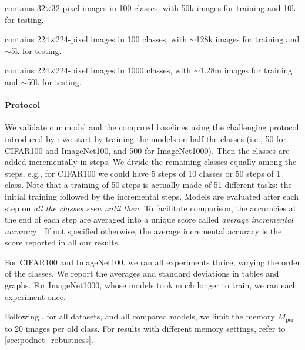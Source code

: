 {\begin{description} \setlength{\parskip}{0pt}
    \item[CIFAR100] contains 32$\times$32-pixel images in 100 classes, with 50k images for training
          and 10k for testing.
    \item[ImageNet100] contains 224$\times$224-pixel images in 100 classes, with $\sim$128k images
          for training and $\sim$5k for testing.
    \item[ImageNet1000] contains 224$\times$224-pixel images in 1000 classes, with $\sim$1.28m
          images for training and $\sim$50k for testing. \end{description}}

\paragraph{Protocol} We validate our model and the compared baselines using the challenging protocol
introduced by \cite{hou2019ucir}: we start by training the models on half the classes
(i.e., 50 for CIFAR100 and ImageNet100, and 500 for ImageNet1000). Then the classes are added
incrementally in steps. We divide the remaining classes equally among the steps, e.g., for CIFAR100
we could have 5 steps of 10 classes or 50 steps of 1 class. Note that a training of 50 steps is
actually made of 51 different tasks: the initial training followed by the incremental steps. Models
are evaluated after each step on \textit{all the classes seen until then}. To facilitate comparison,
the accuracies at the end of each step are averaged into a unique score called \textit{average
    incremental accuracy}~\citep{rebuffi2017icarl}. If not specified otherwise, the average incremental
accuracy is the score reported in all our results.

For CIFAR100 and ImageNet100, we ran all experiments thrice, varying the order of the classes. We
report the averages and standard deviations in tables and graphs. For ImageNet1000, whose models
took much longer to train, we ran each experiment once.

Following \cite{hou2019ucir}, for all datasets, and all compared models, we limit the
memory $M_\textrm{per}$ to 20 images per old class. For results with different memory settings,
refer to \autoref{sec:podnet_robustness}.

